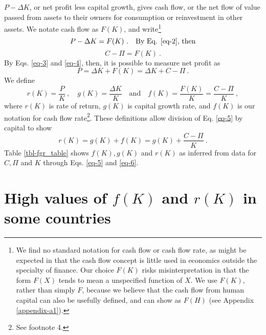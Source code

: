 \documentclass[a4paper,fleqn]{cas-sc}
\begin{document}
$P-\Delta K$, or net profit less capital growth, gives cash flow, or the net flow of value passed from assets to their owners for consumption or reinvestment in other assets. We notate cash flow as $F(K)$, and write\footnote{We find no standard notation for cash flow or cash flow rate, as might be expected in that the cash flow concept is little used in economics outside the specialty of finance. Our choice $F(K)$ risks misinterpretation in that the form $F(X)$ tends to mean a unspecified function of $X$. We use $F(K)$, rather than simply $F$, because we believe that the cash flow from human capital can also be usefully defined, and can show as $F(H)$ (see Appendix \ref{appendix-a1}).}
\begin{equation}
    P - \Delta K = F(K) \ . \quad \text{By Eq. \eqref{eq-2}, then} \label{eq-3}
\end{equation}
\vspace{-5ex}
\begin{equation}
    C - \Pi = F(K) \label{eq-4} \ .
\end{equation}
%
By Eqs. \eqref{eq-3} and \eqref{eq-4}, then, it is possible to measure net profit as 
%
\begin{equation}
P = \Delta K + F(K) = \Delta K + C - \Pi\ . \label{eq-5}
\end{equation}
We define
\begin{equation*}
r(K) = \frac{P}{K}\ , \quad g(K) = \frac{\Delta K}{K} \quad \text{and} \quad f(K) = \frac{F(K)}{K} = \frac{C - \Pi}{K} \ ,
\end{equation*}
where $r(K)$ is rate of return, $g(K)$ is capital growth rate, and $f(K)$ is our notation for cash flow rate\footnote{See footnote 4.}. These definitions allow division of Eq. \eqref{eq-5} by capital to show
\begin{equation}
    r(K) = g(K) + f(K) = g(K) + \frac{C-\Pi}{K}\ . \label{eq-6}
\end{equation}
Table \ref{tbl-fgr_table} shows \(f(K), g(K)\) and \(r(K)\) as inferred from data for \(C,\Pi\) and \(K\) through Eqs. \eqref{eq-5} and \eqref{eq-6}.
%
\FloatBarrier

\FloatBarrier


\section{High values of \(f(K)\) and \(r(K)\) in some countries}
\end{document}

